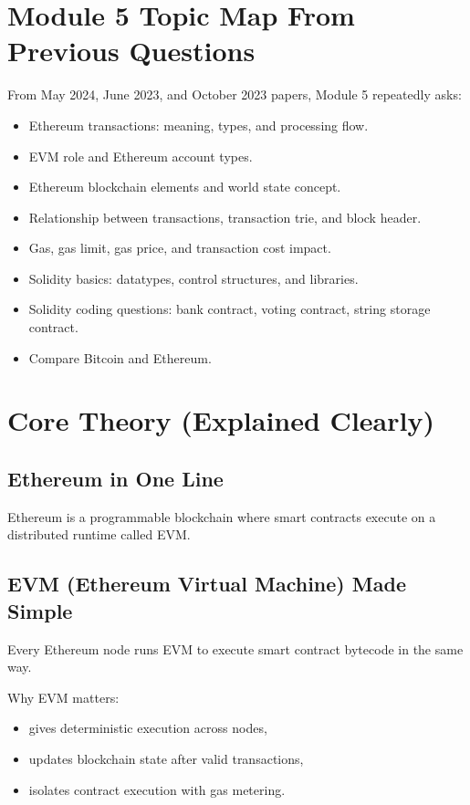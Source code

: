 \documentclass[12pt,a4paper]{article}
\begin{document}
\section{Module 5 Topic Map From Previous Questions}

From May 2024, June 2023, and October 2023 papers, Module 5 repeatedly asks:

\begin{itemize}
\item Ethereum transactions: meaning, types, and processing flow.
\item EVM role and Ethereum account types.
\item Ethereum blockchain elements and world state concept.
\item Relationship between transactions, transaction trie, and block header.
\item Gas, gas limit, gas price, and transaction cost impact.
\item Solidity basics: datatypes, control structures, and libraries.
\item Solidity coding questions: bank contract, voting contract, string storage contract.
\item Compare Bitcoin and Ethereum.
\end{itemize}

\section{Core Theory (Explained Clearly)}

\subsection{Ethereum in One Line}
Ethereum is a programmable blockchain where smart contracts execute on a distributed runtime called EVM.

\subsection{EVM (Ethereum Virtual Machine) Made Simple}
Every Ethereum node runs EVM to execute smart contract bytecode in the same way.

Why EVM matters:
\begin{itemize}
\item gives deterministic execution across nodes,
\item updates blockchain state after valid transactions,
\item isolates contract execution with gas metering.
\end{itemize}
\end{document}
